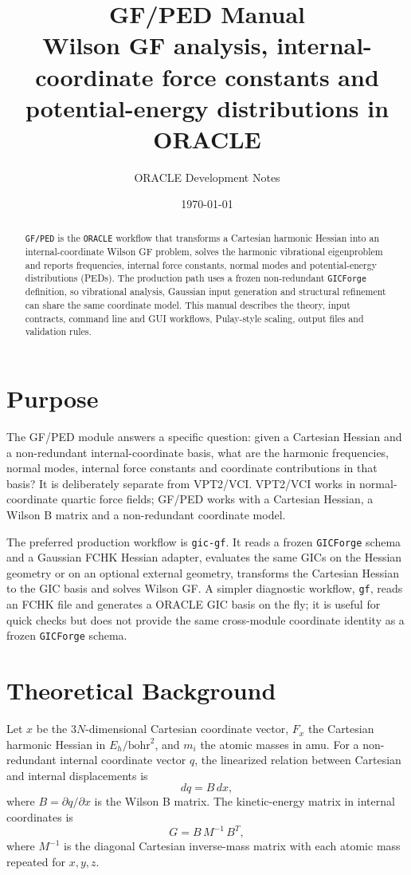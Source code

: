 \documentclass[11pt]{article}
\title{\textbf{GF/PED Manual}\\
\large Wilson GF analysis, internal-coordinate force constants and potential-energy distributions in ORACLE}
\author{ORACLE Development Notes}
\date{\today}
\newcommand{\program}{\texttt{GF/PED}}
\newcommand{\oracle}{\texttt{ORACLE}}
\newcommand{\gicforge}{\texttt{GICForge}}
\newcommand{\bohr}{\text{bohr}}
\begin{document}
\maketitle

\begin{abstract}
\program{} is the \oracle{} workflow that transforms a Cartesian harmonic
Hessian into an internal-coordinate Wilson GF problem, solves the harmonic
vibrational eigenproblem and reports frequencies, internal force constants,
normal modes and potential-energy distributions (PEDs).  The production path
uses a frozen non-redundant \gicforge{} definition, so vibrational analysis,
Gaussian input generation and structural refinement can share the same
coordinate model.  This manual describes the theory, input contracts, command
line and GUI workflows, Pulay-style scaling, output files and validation rules.
\end{abstract}

\tableofcontents
\newpage

\section{Purpose}

The GF/PED module answers a specific question: given a Cartesian Hessian and a
non-redundant internal-coordinate basis, what are the harmonic frequencies,
normal modes, internal force constants and coordinate contributions in that
basis?  It is deliberately separate from VPT2/VCI.  VPT2/VCI works in
normal-coordinate quartic force fields; GF/PED works with a Cartesian Hessian,
a Wilson B matrix and a non-redundant coordinate model.

The preferred production workflow is \texttt{gic-gf}.  It reads a frozen
\gicforge{} schema and a Gaussian FCHK Hessian adapter, evaluates the same GICs
on the Hessian geometry or on an optional external geometry, transforms the
Cartesian Hessian to the GIC basis and solves Wilson GF.  A simpler diagnostic
workflow, \texttt{gf}, reads an FCHK file and generates a ORACLE GIC basis on
the fly; it is useful for quick checks but does not provide the same
cross-module coordinate identity as a frozen \gicforge{} schema.

\section{Theoretical Background}

Let \(x\) be the \(3N\)-dimensional Cartesian coordinate vector, \(F_x\) the
Cartesian harmonic Hessian in \(E_h/\bohr^2\), and \(m_i\) the atomic masses in
amu.  For a non-redundant internal coordinate vector \(q\), the linearized
relation between Cartesian and internal displacements is
\[
  dq = B\,dx ,
\]
where \(B=\partial q/\partial x\) is the Wilson B matrix.  The kinetic-energy
matrix in internal coordinates is
\[
  G = B\,M^{-1}\,B^T ,
\]
where \(M^{-1}\) is the diagonal Cartesian inverse-mass matrix with each atomic
mass repeated for \(x,y,z\).
\end{document}
